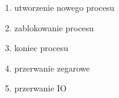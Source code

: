 \begin{enumerate}
	\item utworzenie nowego procesu
	\item zablokowanie procesu
	\item koniec procesu
	\item przerwanie zegarowe
	\item przerwanie IO
\end{enumerate}